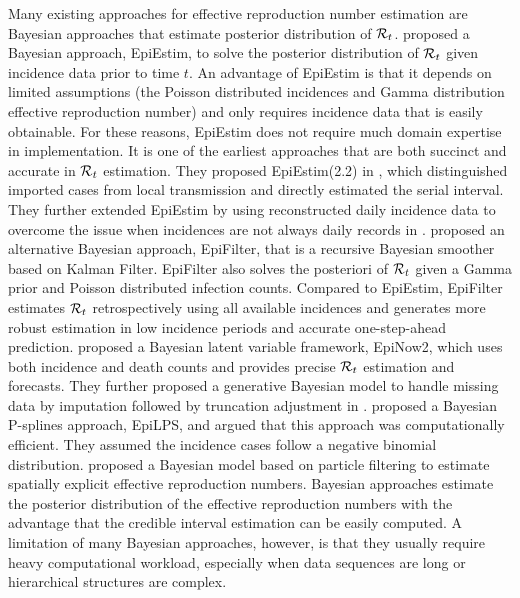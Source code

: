 Many existing approaches for effective reproduction number estimation are Bayesian approaches that estimate posterior distribution of $\mathcal{R}_t$. 
\cite{cori2013new} proposed a Bayesian approach, EpiEstim, to solve the posterior distribution of $\mathcal{R}_t$ given incidence data prior to time $t$. An advantage of EpiEstim is that it depends on limited assumptions (the Poisson distributed incidences and Gamma distribution effective reproduction number) and only requires incidence data that is easily obtainable. For these reasons, EpiEstim does not require much domain expertise in implementation. It is one of the earliest approaches that are both succinct and accurate in $\mathcal{R}_t$ estimation. They proposed EpiEstim(2.2) in \cite{thompson2019improved}, which distinguished imported cases from local transmission and directly estimated the serial interval. They further extended EpiEstim by using reconstructed daily incidence data to overcome the issue when incidences are not always daily records in \cite{nash2023estimating}. 
% 
\cite{parag2021improved} proposed an alternative Bayesian approach, EpiFilter, that is a recursive Bayesian smoother based on Kalman Filter. EpiFilter also solves the posteriori of $\mathcal{R}_t$ given a Gamma prior and Poisson distributed infection counts. Compared to EpiEstim, EpiFilter estimates $\mathcal{R}_t$ retrospectively using all available incidences and generates more robust estimation in low incidence periods and accurate one-step-ahead prediction. 
\cite{abbott2020estimating} proposed a Bayesian latent variable framework, EpiNow2, which uses both incidence and death counts and provides precise $\mathcal{R}_t$ estimation and forecasts. They further proposed a generative Bayesian model to handle missing data by imputation followed by truncation adjustment in \cite{lison2023generative}. 
\cite{gressani2022epilps} proposed a Bayesian P-splines approach, EpiLPS, and argued that this approach was computationally efficient. They assumed the incidence cases follow a negative binomial distribution. 
\cite{trevisin2023spatially} proposed a Bayesian model based on particle filtering to estimate spatially explicit effective reproduction numbers. 
%
Bayesian approaches estimate the posterior distribution of the effective reproduction numbers with the advantage that the credible interval estimation can be easily computed. A limitation of many Bayesian approaches, however, is that they usually require heavy computational workload, especially when data sequences are long or hierarchical structures are complex. 

